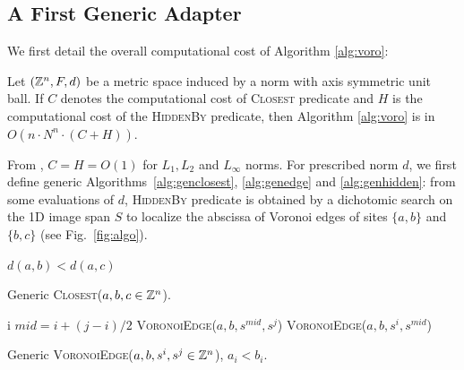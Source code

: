 \documentclass{llncs}
\begin{document}
\subsection{A First Generic Adapter}
\label{sec:first-gener-adapt}
We first detail the overall computational cost of Algorithm
\ref{alg:voro}:
\begin{lemma}
\label{lem:generic}
Let $({\mathbb{Z}}^n, F, d)$ be a metric space induced by a norm with axis
symmetric unit ball. If $C$ denotes the computational cost of
\textsc{Closest} predicate and $H$ is the computational cost of the
\textsc{HiddenBy} predicate, then Algorithm \ref{alg:voro} is in
$O(n\cdot N^n\cdot (C+H))$.
\end{lemma}
From \cite{Breu1995,roerdnik}, $C=H=O(1)$ for $L_1,L_2$ and $L_\infty$
norms.  For prescribed norm $d$, we first define generic
Algorithms~\ref{alg:genclosest}, \ref{alg:genedge} and
\ref{alg:genhidden}: from some evaluations of $d$, \textsc{HiddenBy}
predicate is obtained by a dichotomic search on the 1D image span $S$
to localize the abscissa of Voronoi edges of sites $\{a,b\}$ and
$\{b,c\}$ (see Fig.~\ref{fig:algo}).

\begin{algorithm}[H]\footnotesize
  \Return $d(a,b) < d(a,c)$\;
  \caption{\footnotesize Generic \textsc{Closest}($a,b,c\in{\mathbb{Z}}^n$).\label{alg:genclosest}}
\end{algorithm}

\begin{algorithm}[H]\footnotesize
     {
       \Return  i\;
     }
     $mid  = i + (j-i)/2$\;
       {
         \Return \textsc{VoronoiEdge}($a,b,s^{mid},s^j$)
}
 {
         \Return \textsc{VoronoiEdge}($a,b,s^{i},s^{mid}$)
}

  \caption{\footnotesize Generic \textsc{VoronoiEdge}($a,b,s^i,s^j\in{\mathbb{Z}}^n$), $a_i<b_i$.\label{alg:genedge}}
\end{algorithm}
\end{document}

